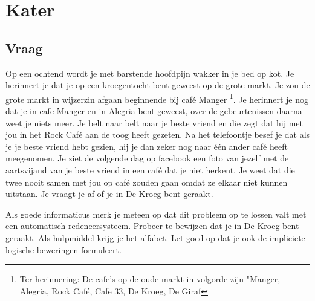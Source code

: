 \documentclass[alternative-exam.tex]{subfiles}
\begin{document}
\chapter{Kater}
\section{Vraag}
Op een ochtend wordt je met barstende hoofdpijn wakker in je bed op kot. Je herinnert je dat je op een kroegentocht bent geweest op de grote markt. Je zou de grote markt in wijzerzin afgaan beginnende bij caf\'e Manger \footnote{Ter herinnering: De cafe's op de oude markt in volgorde zijn "Manger, Alegria, Rock Caf\'e, Cafe 33, De Kroeg, De Giraf}. Je herinnert je nog dat je in cafe Manger en in Alegria bent geweest, over de gebeurtenissen daarna weet je niets meer. Je belt naar belt naar je beste vriend en die zegt dat hij met jou in het Rock Caf\'e aan de toog heeft gezeten. Na het telefoontje besef je dat als je je beste vriend hebt gezien, hij je dan zeker nog naar \'e\'en ander caf\'e heeft meegenomen. Je ziet de volgende dag op facebook een foto van jezelf met de aartsvijand van je beste vriend in een caf\'e dat je niet herkent. Je weet dat die twee nooit samen met jou op caf\'e zouden gaan omdat ze elkaar niet kunnen uitstaan. Je vraagt je af of je in De Kroeg bent geraakt.

Als goede informaticus merk je meteen op dat dit probleem op te lossen valt met een automatisch redeneersysteem. Probeer te bewijzen dat je in De Kroeg bent geraakt. Als hulpmiddel krijg je het alfabet. Let goed op dat je ook de impliciete logische beweringen formuleert.
\end{document}
